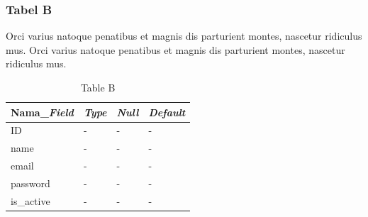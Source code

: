 \subsubsection{Tabel B}
Orci varius natoque penatibus et magnis dis parturient montes, nascetur ridiculus mus. Orci varius natoque penatibus et magnis dis parturient montes, nascetur ridiculus mus.
\begin{table}[ht!]
    \centering
    \begin{tabular}{|l|l|l|l|}
        \hline
        \textbf{Nama\_\textit{Field}} & \textbf{\textit{Type}} & \textbf{\textit{Null}} & \textbf{\textit{Default}} \\ \hline
        ID                            & -                      & -                      & -                         \\ \hline
        name                          & -                      & -                      & -                         \\ \hline
        email                         & -                      & -                      & -                         \\ \hline
        password                      & -                      & -                      & -                         \\ \hline
        is\_active                    & -                      & -                      & -                         \\ \hline
    \end{tabular}
    \caption{Table B}
    \label{tab:relationTableB}
\end{table}